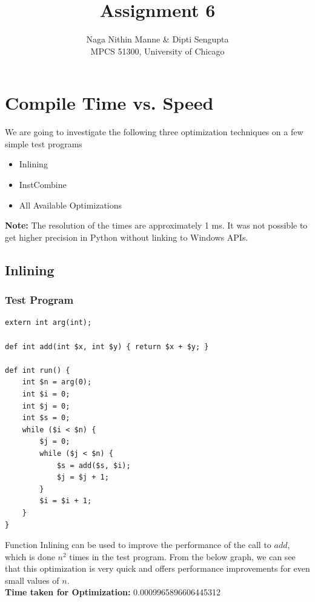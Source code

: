 \documentclass[letter,11pt]{article}
\title{Assignment 6}
\author{Naga Nithin Manne \& Dipti Sengupta\\ MPCS 51300, University of Chicago}
\date{} %
\begin{document}
\maketitle %

\section*{Compile Time vs. Speed}

We are going to investigate the following three optimization techniques on a few simple test programs
\begin{itemize}
  \item Inlining
  \item InstCombine
  \item All Available Optimizations
\end{itemize}

\textbf{Note:} The resolution of the times are approximately 1 ms. It was not possible to get higher precision in Python without linking to Windows APIs.

\subsection*{Inlining}

\subsubsection*{Test Program}

\begin{verbatim}
extern int arg(int);

def int add(int $x, int $y) { return $x + $y; }

def int run() {
    int $n = arg(0);
    int $i = 0;
    int $j = 0;
    int $s = 0;
    while ($i < $n) {
        $j = 0;
        while ($j < $n) {
            $s = add($s, $i);
            $j = $j + 1;
        }
        $i = $i + 1;
    }
}
\end{verbatim}

Function Inlining can be used to improve the performance of the call to $add$, which is done $n^2$ times in the test program. From the below graph, we can see that this optimization is very quick and offers performance improvements for even small values of $n$.\\
\textbf{Time taken for Optimization:} 0.0009965896606445312
\end{document}
